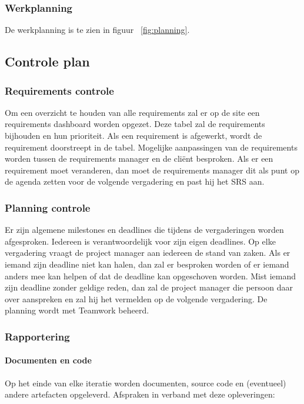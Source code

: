 \subsubsection{Werkplanning}

De werkplanning is te zien in figuur ~\ref{fig:planning}.

\subsection{Controle plan}
\subsubsection{Requirements controle}
Om een overzicht te houden van alle requirements zal er op de site \cite{Website} een requirements dashboard worden opgezet. Deze tabel zal de requirements bijhouden en hun prioriteit. Als een requirement is afgewerkt, wordt de requirement doorstreept in de tabel. Mogelijke aanpassingen van de requirements worden tussen de requirements manager en de cliënt besproken. Als er een requirement moet veranderen, dan moet de requirements manager dit als punt op de agenda zetten voor de volgende vergadering en past hij het SRS aan.

\subsubsection{Planning controle}

Er zijn algemene milestones en deadlines die tijdens de vergaderingen worden afgesproken. Iedereen is verantwoordelijk voor zijn eigen deadlines. Op elke vergadering vraagt de project manager aan iedereen de stand van zaken. Als er iemand zijn deadline niet kan halen, dan zal er besproken worden of er iemand anders mee kan helpen of dat de deadline kan opgeschoven worden. Mist iemand zijn deadline zonder geldige reden, dan zal de project manager die persoon daar over aanspreken en zal hij het vermelden op de volgende vergadering. De planning wordt met Teamwork \cite{Teamwork} beheerd. 

\subsubsection{Rapportering} 
\paragraph{Documenten en code} 
Op het einde van elke iteratie worden documenten, source code en (eventueel) andere artefacten opgeleverd.
Afspraken in verband met deze opleveringen: 

